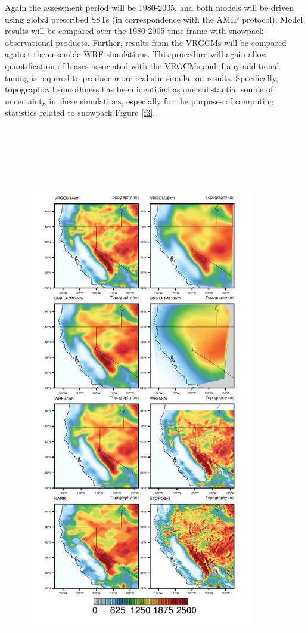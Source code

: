 \documentclass[11pt]{article}
\begin{document}
Again the assessment period will be 1980-2005, and both models will be driven using global prescribed SSTs (in correspondence with the AMIP protocol). Model results will be compared over the 1980-2005 time frame with snowpack observational products. Further, results from the VRGCMs  will  be  compared against the ensemble WRF simulations. This procedure will again allow quantification of biases associated with the VRGCMs and if any additional tuning is required to produce more realistic simulation results.  Specifically, topographical smoothness has been identified as one substantial source of uncertainty in these simulations, especially for the purposes of computing statistics related to snowpack Figure \ref{f3}.

\begin{figure}
  \begin{center}
  \includegraphics[width=10cm,height=25cm,keepaspectratio]{Topography}

\end{center}
\end{figure}
\end{document}

